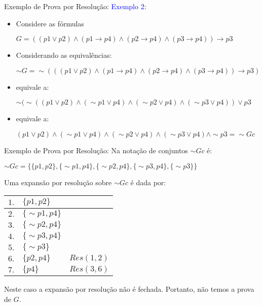 \begin{frame}{Exemplo de Prova por Resolução:}
 \textcolor{blue}{Exemplo 2:}
 \begin{itemize}
\item Considere as fórmulas
\vspace{0.5cm}

$G=((p1 \vee p2)\wedge(p1\rightarrow p4)\wedge(p2\rightarrow p4)\wedge(p3\rightarrow p4))\rightarrow p3$
\vspace{0.5cm}

\item Considerando as equivalências:
\vspace{0.5cm}

$\sim G=\sim(((p1\vee p2)\wedge(p1\rightarrow p4)\wedge(p2\rightarrow p4)\wedge(p3\rightarrow p4))\rightarrow p3)$
\vspace{0.5cm}

\item equivale a:

$\sim(\sim((p1\vee p2)\wedge(\sim p1\vee p4)\wedge(\sim p2\vee p4)\wedge(\sim p3\vee p4))\vee p3$
\vspace{0.5cm}

\item equivale a:

$(p1\vee p2)\wedge(\sim p1\vee p4)\wedge(\sim p2\vee p4)\wedge(\sim p3\vee p4)\wedge \sim p3=\sim Gc$
\end{itemize}
\end{frame}

\begin{frame}{Exemplo de Prova por Resolução:}
Na notação de conjuntos $\sim Gc$ é:

$\sim Gc = \{\{p1,p2\},\{\sim p1,p4\},\{\sim p2,p4\},\{\sim p3,p4\},\{\sim p3\}\}$

Uma expansão por resolução sobre $\sim Gc$ é dada por:
\\
\begin{table}
\centering
\begin{tabular}{r|l|r}
\hline
\hline
$1.$&$\{p1,p2\}$&$ $\\
\hline
$2.$&$\{\sim p1,p4\}$&$ $\\
\hline
$3.$&$\{\sim p2,p4\}$&$ $\\
\hline
$4.$&$\{\sim p3,p4\}$&$ $\\
\hline
$5.$&$\{\sim p3\}$&$ $\\
\hline
$6.$&$\{p2,p4\}$&$Res(1,2)$\\
\hline
$7.$&$\{p4\}$&$Res(3,6)$\\
\hline
\hline
\end{tabular}
\end{table}

Neste caso a expansão por resolução não é fechada. Portanto, não temos a prova de $G$.
\end{frame}


